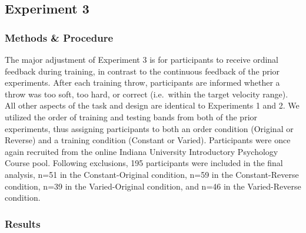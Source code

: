 \documentclass[
  12pt,
  letterpaper,
]{article}
\begin{document}
\subsection{Experiment 3}\label{experiment-3}

\subsubsection{Methods \& Procedure}\label{methods-procedure-1}

The major adjustment of Experiment 3 is for participants to receive
ordinal feedback during training, in contrast to the continuous feedback
of the prior experiments. After each training throw, participants are
informed whether a throw was too soft, too hard, or correct (i.e.~within
the target velocity range). All other aspects of the task and design are
identical to Experiments 1 and 2. We utilized the order of training and
testing bands from both of the prior experiments, thus assigning
participants to both an order condition (Original or Reverse) and a
training condition (Constant or Varied). Participants were once again
recruited from the online Indiana University Introductory Psychology
Course pool. Following exclusions, 195 participants were included in the
final analysis, n=51 in the Constant-Original condition, n=59 in the
Constant-Reverse condition, n=39 in the Varied-Original condition, and
n=46 in the Varied-Reverse condition.

\subsubsection{Results}\label{results-4}
\end{document}
